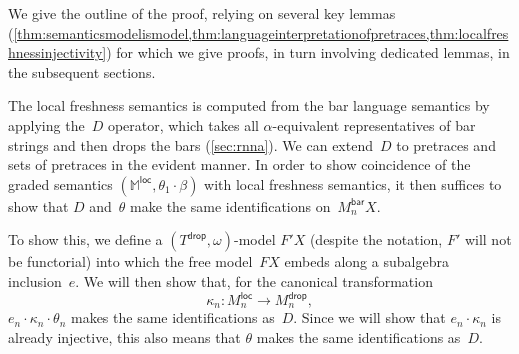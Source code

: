 \documentclass[a4paper,UKenglish,cleveref,thm-restate,numberwithinsect,final]{lipics-v2021}
\newcommand{\Br}{\mathsf{bar}}
\newcommand{\loc}{\mathsf{loc}}
\newcommand{\drop}{\mathsf{drop}}
\theoremstyle{plain}
\numberwithin{equation}{section}
\newcommand{\monad}{{\mathbb{M}}}
\newcommand{\+}[1]{\mathcal{#1}\xspace}
\theoremstyle{definition}
\begin{document}
We give the outline of the proof, relying on several key lemmas
(\cref{thm:semanticsmodelismodel,thm:languageinterpretationofpretraces,thm:localfreshnessinjectivity})
for which we give proofs, in turn involving dedicated lemmas, in the
subsequent sections.

The local freshness semantics is computed from the bar language
semantics by applying the~$D$ operator, which takes all
$\alpha$-equivalent representatives of bar strings and then drops the
bars (\cref{sec:rnna}). We can extend~$D$ to pretraces and sets of
pretraces in the evident manner. In order to show coincidence of the
graded semantics $(\monad^\loc,\theta_1\cdot\beta)$ with local
freshness semantics, it then suffices to show that $D$ and~$\theta$
make the same identifications on~$M_n^\Br X$.

To show this, we define a $(T^\drop, \omega)$-model $F'X$ (despite the notation, $F'$ will not be functorial) into which the free model~$FX$ embeds along a subalgebra inclusion~$e$.
We will then show that, for the canonical transformation
\begin{equation*}
  \kappa_n\colon M_n^\loc \to M_n^\drop,
\end{equation*}
$e_n \cdot \kappa_n \cdot \theta_n$ makes the same identifications as~$D$. %
Since we will show that $e_n \cdot \kappa_n$ is already injective, this also means that $\theta$ makes the same identifications as~$D$.
\end{document}
